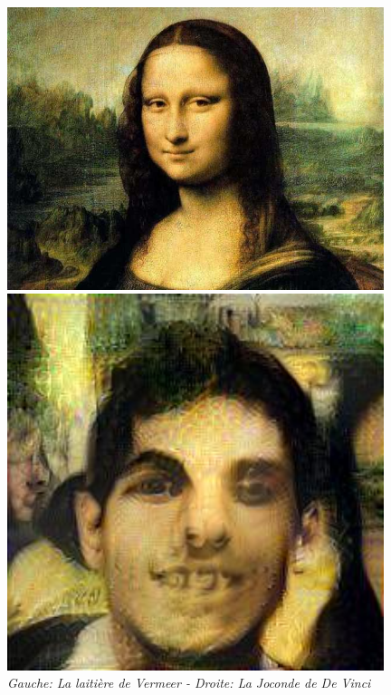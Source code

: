 \documentclass{article}
\begin{document}
\begin{figure}[!htb]
\begin{minipage}{0.25\textwidth}
\end{minipage}%
\begin{minipage}{0.25\textwidth}
\centering
\includegraphics[width=0.98\textwidth]{../Images/joconde.jpg}
\end{minipage}%
\begin{minipage}{0.25\textwidth}
\centering
\includegraphics[width=0.98\textwidth]{../Images/transfer/tdf_joconde.jpg}
\end{minipage}
\caption{\textit{Gauche: La laitière de Vermeer - Droite: La Joconde de De Vinci}}
\label{fig:set_3}
\end{figure}
\end{document}
